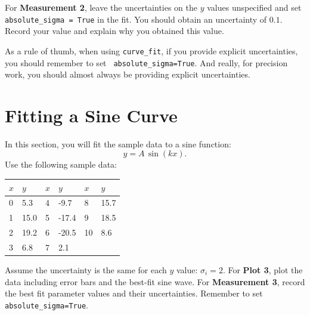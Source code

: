 For {\bf Measurement 2}, leave the uncertainties on the $y$ values
unspecified and set {\tt absolute{\_}sigma = True} in the fit.  You
should obtain an uncertainty of $0.1$.  Record your value and explain
why you obtained this value.

As a rule of thumb, when using {\tt curve{\_}fit}, if you provide
explicit uncertainties, you should remember to set {\tt
  absolute{\_}sigma=True}.  And really, for precision work, you should
almost always be providing explicit uncertainties.

\section{Fitting a Sine Curve}

In this section, you will fit the sample data to a sine function:
\begin{displaymath}
 y = A \, \sin( k x). 
\end{displaymath}
Use the following sample data:\\
\begin{center}
\begin{tabular}{|ll| ll|ll|}
\hline
$x$ & $y$ & $x$ & $y$ & $x$ & $y$\\
\hline
0  & 5.3    & 4  & -9.7   & 8  & 15.7  \\
1  & 15.0   & 5  & -17.4  & 9  & 18.5  \\
2  & 19.2   & 6  & -20.5  & 10 & 8.6   \\
3  & 6.8    & 7  &  2.1   & &  \\
\hline
\end{tabular}
\end{center}
Assume the uncertainty is the same for each $y$ value: $\sigma_i = 2$.
For {\bf Plot 3}, plot the data including error bars and the best-fit
sine wave.  For {\bf Measurement 3}, record the best fit parameter
values and their uncertainties.  Remember to set {\tt
  absolute{\_}sigma=True}.





















